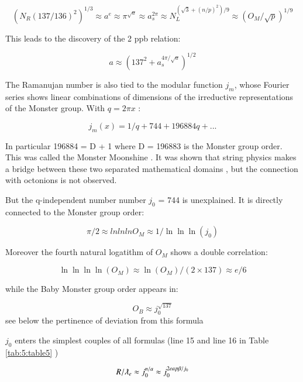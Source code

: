 \documentclass[a4paper,9pt]{article}
\begin{document}
\begin{equation}
(N_R (137/136)^2)^{1/3} \approx a^e \approx \pi^{\sqrt a} \approx a_s^{2\pi} \approx N_L^{(\sqrt3 +(n/p)^2)/9} \approx (O_M/\sqrt p)^{1/9}
\end{equation}

This leads to the discovery of the 2 ppb relation:

\begin{equation}
a \approx (137^2 + a_s^{4\pi/\sqrt a})^{1/2}
\end{equation}

The Ramanujan number is also tied to the modular function $j_m$, whose Fourier series shows linear combinations of dimensions of the irreductive representations of the Monster group. With $q = 2\pi x$ :

\begin{equation}
j_m(x) = 1/q + 744 + 196884 q + ...
\end{equation}

In particular 196884 = D + 1 where D = 196883 is the Monster group order. This was called the Monster Moonshine \cite{Conway}. It was shown that string physics makes a bridge between these two separated mathematical domains \cite{Borcherds}, but the connection with octonions is not observed. 


But the q-independent number number $j_0$ = 744 is unexplained. It is directly connected to the Monster group order:

 \begin{equation}
 \pi/2 \approx lnlnlnO_M \approx 1/\ln\ln\ln(j_0)
\end{equation}

Moreover the fourth natural logatithm of $O_M$ shows a double correlation:

 \begin{equation}
 \ln\ln\ln\ln(O_M) \approx \ln(O_M) /(2\times 137) \approx e/6
\end{equation}

while the Baby Monster group order appears in:

\begin{equation}
 O_B \approx j_0^{\sqrt{137}}
\end{equation}
see below the pertinence of deviation from this formula

$j_0$ enters the simplest couples of all formulas (line 15 and line 16 in 
 Table \ref{tab:5:table5} )
 
 \begin{equation}
 R/\lambdabar_e \approx j_0^{n/a} \approx j_0^{2eap\beta/j_0} 
\end{equation}
\end{document}
